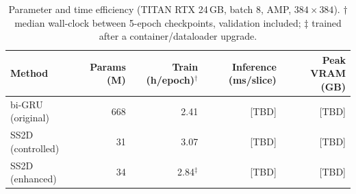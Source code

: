\begin{table}[ht]
\centering
\caption{Parameter and time efficiency (TITAN RTX 24\,GB, batch 8, AMP, $384\times384$). $\dagger$ median wall-clock between 5-epoch checkpoints, validation included; $\ddagger$ trained after a container/dataloader upgrade.}
\label{tab:efficiency}
\begin{tabular}{lrrrr}
\toprule
Method & Params (M) & Train (h/epoch)$^\dagger$ & Inference (ms/slice) & Peak VRAM (GB) \\
\midrule
bi-GRU (original) & 668 & 2.41 & [TBD] & [TBD] \\
SS2D (controlled) & 31 & 3.07 & [TBD] & [TBD] \\
SS2D (enhanced) & 34 & 2.84$^\ddagger$ & [TBD] & [TBD] \\
\bottomrule
\end{tabular}
\end{table}

